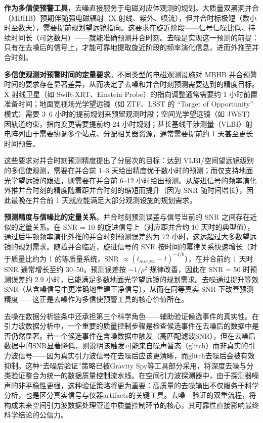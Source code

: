 \textbf{作为多信使预警工具}，去噪直接服务于电磁对应体观测的规划。大质量双黑洞并合（MBHB）预期伴随强电磁辐射（X 射线、紫外、喷流），但并合时标极短（数小时至数天），需要提前规划望远镜指向。这要求在旋近阶段——信号信噪比低、持续时间长（可达数月）——就能准确预测并合时刻。去噪是实现这一预测的前提：只有在去噪后的信号上，才能可靠地提取旋近阶段的频率演化信息，进而外推至并合时刻。

\textbf{多信使观测对预警时间的定量要求}。不同类型的电磁观测设施对 MBHB 并合预警时间的要求存在显著差异，从而决定了去噪和并合时刻预测需要达到的精度目标。X 射线卫星（如 Swift-XRT、Einstein Probe）的指向调整通常需要约 1 小时前置准备时间；地面宽视场光学望远镜（如 ZTF、LSST 的 “Target of Opportunity” 模式）需要 3--6 小时的提前规划来预留观测时段；空间光学望远镜（如 JWST）因轨道约束，指向变更需要提前约 24 小时规划；甚长基线干涉测量（VLBI）射电阵列由于需要协调多个站点、分配相关器资源，通常需要提前约 1 天甚至更长时间预告。

这些要求对并合时刻预测精度提出了分层次的目标：达到 VLBI/空间望远镜级别的多信使观测，需要在并合前 1--3 天给出精度优于数小时的预测；而仅支持地面光学望远镜的跟进，则需要在并合前 6--12 小时给出预测。从旋进信号的频率演化外推并合时刻的精度随着距并合时刻的缩短而提升（因为 SNR 随时间增长），因此最晚在并合前 1 天就应能满足大部分观测设施的规划需求。

\textbf{预测精度与信噪比的定量关系}。并合时刻预测误差与信号当前的 SNR 之间存在近似的定量关系。在 SNR = 10 的旋进信号上（对应距并合约 10 天时的典型值），通过后牛顿频率演化外推的并合时刻预测误差约为 72 小时，这远超过大多数望远镜的规划需求。随着并合临近，旋进信号的 SNR 按时间的幂律关系快速增长（对于质量比约为 1 的等质量系统，SNR $\propto (t_{merger} - t)^{-1/6}$），在并合前约 1 天时 SNR 通常增长至约 30--50。预测误差按 $\sim 1/\rho^2$ 规律改善，因此在 SNR = 50 时预测误差约 2.9 小时，已能满足多数地面光学望远镜的规划需求。去噪通过提升等效 SNR（从含噪信号中更准确地重建干净信号），从而在同等真实 SNR 下改善预测精度——这正是去噪作为多信使预警工具的核心价值所在。

去噪在数据分析链条中还承担第三个科学角色——辅助验证候选事件的真实性。在引力波数据分析中，一个重要的质量控制步骤是检查候选事件在去噪后的数据中是否仍然显著。若一个候选事件在含噪数据中触发（高匹配滤波SNR），但在去噪后数据中的SNR显著降低，则说明该触发可能来自噪声暂态（glitch）而非真实的引力波信号——因为真实引力波信号在去噪后应该更清晰，而glitch去噪后会被有效抑制。这种“去噪后验证”策略已被Gravity Spy等工具部分采用，将深度去噪与分类验证整合为统一的数据质量控制流水线。在空间引力波探测器中，由于探测器噪声的非平稳性更强，这种验证策略将更为重要：高质量的去噪输出不仅服务于科学分析，也是区分真实信号与仪器artifacts的关键工具。去噪—验证的双重流程，将构成未来空间引力波数据处理管道中质量控制环节的核心，其可靠性直接影响最终科学结论的公信力。

